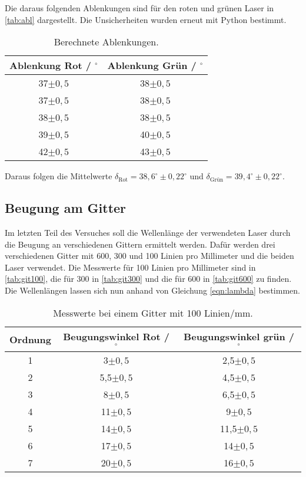 \noindent
Die daraus folgenden Ablenkungen sind für den roten und grünen Laser in \autoref{tab:abl} dargestellt. Die Unsicherheiten wurden erneut mit Python bestimmt.

\begin{table}[H]
  \centering
  \caption{Berechnete Ablenkungen.}
  \label{tab:abl}
  \begin{tabular}{c c }
    \toprule
    Ablenkung Rot / $^{\circ}$ & Ablenkung Grün / $^{\circ}$\\
    \midrule
    37$\pm 0,5$ & 38$\pm 0,5$\\
    37$\pm 0,5$ & 38$\pm 0,5$\\
    38$\pm 0,5$ & 38$\pm 0,5$\\
    39$\pm 0,5$ & 40$\pm 0,5$\\
    42$\pm 0,5$ & 43$\pm 0,5$\\
    \bottomrule
  \end{tabular}
\end{table}

\noindent
Daraus folgen die Mittelwerte $\delta_\text{Rot} = 38,6^{\circ} \pm 0,22^{\circ}$ und $\delta_\text{Grün} = 39,4^{\circ} \pm 0,22^{\circ}$.

\subsection{Beugung am Gitter}

Im letzten Teil des Versuches soll die Wellenlänge der verwendeten Laser durch die Beugung an verschiedenen Gittern ermittelt werden. Dafür werden drei verschiedenen
Gitter mit 600, 300 und 100 Linien pro Millimeter und die beiden Laser verwendet. Die Messwerte für 100 Linien pro Millimeter sind in \autoref{tab:git100}, die
für 300 in \autoref{tab:git300} und die für 600 in \autoref{tab:git600} zu finden.
\newline
Die Wellenlängen lassen sich nun anhand von Gleichung \eqref{eqn:lambda} bestimmen.

\begin{table}[H]
  \centering
  \caption{Messwerte bei einem Gitter mit 100 Linien/mm.}
  \label{tab:git100}
  \begin{tabular}{c c c}
    \toprule
    Ordnung & Beugungswinkel Rot / $^{\circ}$ & Beugungswinkel grün / $^{\circ}$\\
    \midrule
    1 & 3$\pm 0,5$ & 2,5$\pm 0,5$\\
    2 & 5,5$\pm 0,5$ & 4,5$\pm 0,5$\\
    3 & 8$\pm 0,5$ & 6,5$\pm 0,5$\\
    4 & 11$\pm 0,5$ & 9$\pm 0,5$\\
    5 & 14$\pm 0,5$ & 11,5$\pm 0,5$\\
    6 & 17$\pm 0,5$ & 14$\pm 0,5$\\
    7 & 20$\pm 0,5$ & 16$\pm 0,5$\\
    \bottomrule
  \end{tabular}
\end{table}


